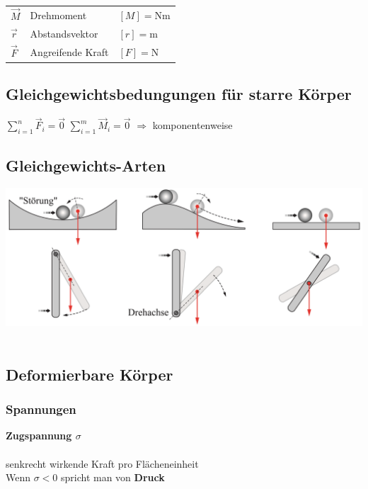 		\begin{tabular}{lll}
			$\vec{M}$ & Drehmoment & $[M] = \mathrm{Nm}$ \\
			$\vec{r}$ & Abstandsvektor & $[r] = \mathrm{m}$ \\
			$\vec{F}$ & Angreifende Kraft & $[F] = \mathrm{N}$ \\
		\end{tabular}

	\subsection{Gleichgewichtsbedungungen für starre Körper}
		
		$ \sum \limits_{i = 1}^n \vec{F}_i = \vec{0}$  \qquad  $ \sum \limits_{i = 1}^m \vec{M}_i = \vec{0} $  \qquad $\Rightarrow$ komponentenweise
	
	\subsection{Gleichgewichts-Arten}	
		\includegraphics[width=0.95\linewidth]{Bilder/gleichgewichte} \\
		\\
		\begin{minipage}{0.3\linewidth}
		\end{minipage}
		\hfill
		\begin{minipage}{0.3\linewidth}
		\end{minipage}
		\hfill
		\begin{minipage}{0.3\linewidth}
		\end{minipage}

	\subsection{Deformierbare Körper}
		
		\subsubsection{Spannungen}
			\textbf{Zugspannung $\sigma$} \\
				\\
				senkrecht wirkende Kraft pro Flächeneinheit \\
				Wenn $\sigma < 0$ spricht man von \textbf{Druck} 
				
